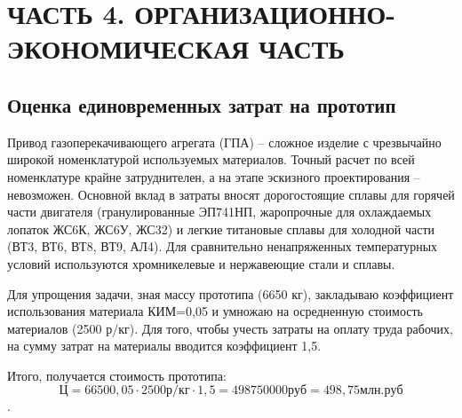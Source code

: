 \section{ЧАСТЬ 4. ОРГАНИЗАЦИОННО-ЭКОНОМИЧЕСКАЯ ЧАСТЬ}
\subsection{Оценка единовременных затрат на прототип}
Привод газоперекачивающего агрегата (ГПА) – сложное изделие с чрезвычайно широкой номенклатурой используемых материалов.
Точный расчет по всей номенклатуре крайне затруднителен, а на этапе эскизного проектирования – невозможен. Основной
вклад в затраты вносят дорогостоящие сплавы для горячей части двигателя (гранулированные ЭП741НП, жаропрочные для
охлаждаемых лопаток ЖС6К, ЖС6У, ЖС32) и легкие титановые сплавы для холодной части (ВТ3, ВТ6, ВТ8, ВТ9, АЛ4). Для
сравнительно ненапряженных температурных условий используются хромникелевые и нержавеющие стали и сплавы.

Для упрощения задачи, зная массу прототипа (6650 кг), закладываю коэффициент использования материала КИМ=0,05 и умножаю
на осредненную стоимость материалов (2500 р/кг). Для того, чтобы учесть затраты на оплату труда рабочих, на сумму затрат
на материалы вводится коэффициент 1,5.

Итого, получается стоимость прототипа:
$$
    Ц = 66500,05 \cdot 2500 р/кг \cdot 1,5 = 498750000 руб = 498,75 млн.руб
$$.

